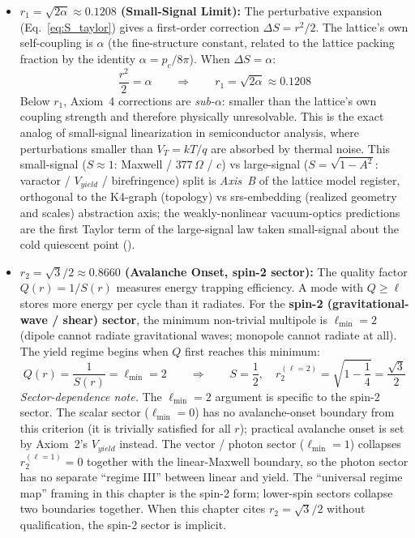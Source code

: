 \begin{itemize}
    \item \textbf{$r_1 = \sqrt{2\alpha} \approx 0.1208$ (Small-Signal Limit):} The perturbative expansion (Eq.~\ref{eq:S_taylor}) gives a first-order correction $\Delta S = r^2/2$. The lattice's own self-coupling is $\alpha$ (the fine-structure constant, related to the lattice packing fraction by the identity $\alpha = p_c/8\pi$). When $\Delta S = \alpha$:
    \begin{equation}
        \frac{r^2}{2} = \alpha \qquad \Longrightarrow \qquad r_1 = \sqrt{2\alpha} \approx 0.1208
    \end{equation}
    Below $r_1$, Axiom~4 corrections are \textit{sub-$\alpha$}: smaller than the lattice's own coupling strength and therefore physically unresolvable. This is the exact analog of small-signal linearization in semiconductor analysis, where perturbations smaller than $V_T = kT/q$ are absorbed by thermal noise. This small-signal ($S\approx1$: Maxwell / $377\,\Omega$ / $c$) vs large-signal ($S=\sqrt{1-A^2}$: varactor / $V_{yield}$ / birefringence) split is \emph{Axis~B} of the lattice model register, orthogonal to the K4-graph (topology) vs srs-embedding (realized geometry and scales) abstraction axis; the weakly-nonlinear vacuum-optics predictions are the first Taylor term of the large-signal law taken small-signal about the cold quiescent point ().

    \item \textbf{$r_2 = \sqrt{3}/2 \approx 0.8660$ (Avalanche Onset, spin-2 sector):} The quality factor $Q(r) = 1/S(r)$ measures energy trapping efficiency. A mode with $Q \geq \ell$ stores more energy per cycle than it radiates. For the \textbf{spin-2 (gravitational-wave / shear) sector}, the minimum non-trivial multipole is $\ell_{\min} = 2$ (dipole cannot radiate gravitational waves; monopole cannot radiate at all). The yield regime begins when $Q$ first reaches this minimum:
    \begin{equation}
        Q(r) = \frac{1}{S(r)} = \ell_{\min} = 2 \qquad \Longrightarrow \qquad S = \frac{1}{2}, \quad r_2^{(\ell=2)} = \sqrt{1 - \frac{1}{4}} = \frac{\sqrt{3}}{2}
    \end{equation}
    \textit{Sector-dependence note.} The $\ell_{\min} = 2$ argument is specific to the spin-2 sector. The scalar sector ($\ell_{\min} = 0$) has no avalanche-onset boundary from this criterion (it is trivially satisfied for all $r$); practical avalanche onset is set by Axiom~2's $V_{yield}$ instead. The vector / photon sector ($\ell_{\min} = 1$) collapses $r_2^{(\ell=1)} = 0$ together with the linear-Maxwell boundary, so the photon sector has no separate ``regime III'' between linear and yield. The ``universal regime map'' framing in this chapter is the spin-2 form; lower-spin sectors collapse two boundaries together. When this chapter cites $r_2 = \sqrt{3}/2$ without qualification, the spin-2 sector is implicit.


\end{itemize}
